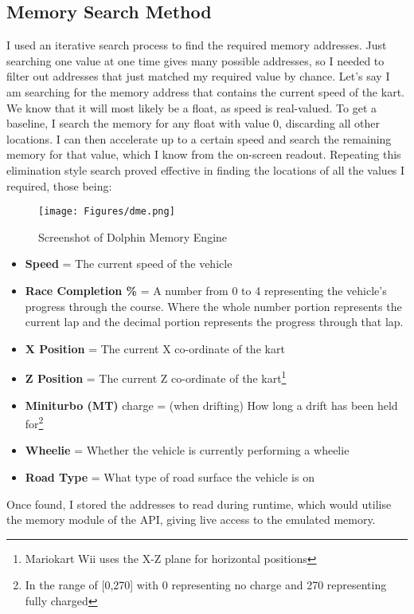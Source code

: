 \subsection{Memory Search Method}
I used an iterative search process to find the required memory addresses. Just searching one value at one time gives many possible addresses, so I needed to filter out addresses that just matched my required value by chance. Let's say I am searching for the memory address that contains the current speed of the kart. We know that it will most likely be a float, as speed is real-valued. To get a baseline, I search the memory for any float with value 0, discarding all other locations. I can then accelerate up to a certain speed and search the remaining memory for that value, which I know from the on-screen readout. Repeating this elimination style search proved effective in finding the locations of all the values I required, those being:
\begin{figure}[bt]
    \centering
    \texttt{[image: Figures/dme.png]}
    \caption{Screenshot of Dolphin Memory Engine}
    \label{fig:dme}
\end{figure}
\begin{itemize}
    \item \textbf{Speed} = The current speed of the vehicle
    \item \textbf{Race Completion \%}  = A number from 0 to 4 representing the vehicle's progress through the course. Where the whole number portion represents the current lap and the decimal portion represents the progress through that lap.
    \item \textbf{X Position} = The current X co-ordinate of the kart
    \item \textbf{Z Position} = The current Z co-ordinate of the kart\footnote{Mariokart Wii uses the X-Z plane for horizontal positions}
    \item \textbf{Miniturbo (MT)} charge = (when drifting) How long a drift has been held for\footnote{In the range of [0,270] with 0 representing no charge and 270 representing fully charged}
    \item \textbf{Wheelie} = Whether the vehicle is currently performing a wheelie
    \item \textbf{Road Type} = What type of road surface the vehicle is on
\end{itemize}
Once found, I stored the addresses to read during runtime, which would utilise the memory module of the API, giving live access to the emulated memory.
